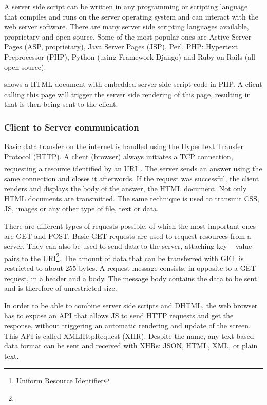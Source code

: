 A server side script can be written in any programming or scripting language that compiles and runs on the server operating system and can interact with the web server software.
There are many server side scripting languages available, proprietary and open source.
Some of the most popular ones are Active Server Pages (ASP, proprietary), Java Server Pages (JSP), Perl, PHP: Hypertext Preprocessor (PHP), Python (using Framework Django) and Ruby on Rails (all open source).

 shows a HTML document with embedded server side script code in PHP.
A client calling this page will trigger the server side rendering of this page, resulting in  that is then being sent to the client.



\subsubsection{Client to Server communication}
\label{sec:servercom}

Basic data transfer on the internet is handled using the HyperText Transfer Protocol (HTTP).
A client (browser) always initiates a TCP connection, requesting a resource identified by an URI\footnote{Uniform Resource Identifier}.
The server sends an answer using the same connection and closes it afterwords.
If the request was successful, the client renders and displays the body of the answer, the HTML document. Not only HTML documents are transmitted. The same technique is used to transmit CSS, JS, images or any other type of file, text or data.

There are different types of requests possible, of which the most important ones are GET and POST.
Basic GET requests are used to request resources from a server.
They can also be used to send data to the server, attaching key -- value pairs to the URI\footnote{}. The amount of data that can be transferred with GET is restricted to about 255 bytes.
A  request message consists, in opposite to a GET request, in a header and a body.
The message body contains the data to be sent and is therefore of unrestricted size.

In order to be able to combine server side scripts and DHTML, the web browser has to expose an API that allows JS to send HTTP requests and get the response, without triggering an automatic rendering and update of the screen.
This API is called XMLHttpRequest (XHR). Despite the name, any text based data format can be sent and received with XHRs: JSON, HTML, XML, or plain text.


